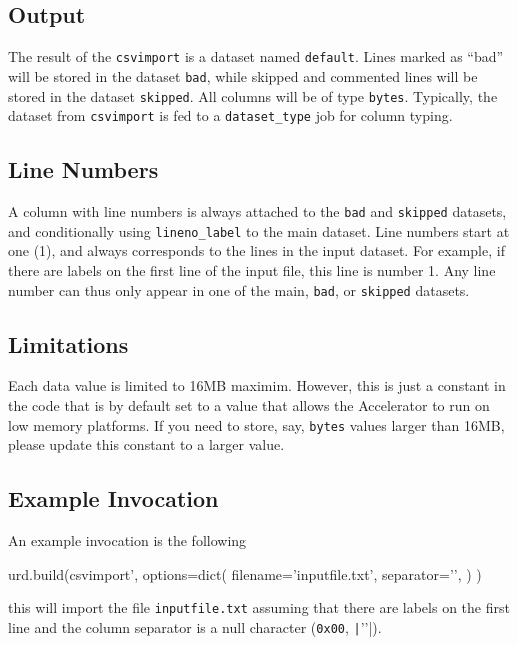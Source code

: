 \subsection{Output}
The result of the \texttt{csvimport} is a dataset named
\texttt{default}.  Lines marked as ``bad'' will be stored in the
dataset \texttt{bad}, while skipped and commented lines will be stored
in the dataset \texttt{skipped}.  All columns will be of type
\texttt{bytes}.  Typically, the dataset from
\texttt{csvimport} is fed to a \texttt{dataset\_type} job for column
typing.


\subsection{Line Numbers}
A column with line numbers is always attached to the \texttt{bad}
and \texttt{skipped} datasets, and conditionally
using \texttt{lineno\_label} to the main dataset.  Line numbers start
at one (1), and always corresponds to the lines in the input dataset.
For example, if there are labels on the first line of the input file,
this line is number 1.  Any line number can thus only appear in one of
the main, \texttt{bad}, or \texttt{skipped} datasets.



\subsection{Limitations}
Each data value is limited to 16MB maximim.  However, this is just a
constant in the code that is by default set to a value that allows the
Accelerator to run on low memory platforms.  If you need to store,
say, \texttt{bytes} values larger than 16MB, please update this
constant to a larger value.



\subsection{Example Invocation}
An example invocation is the following

\begin{python}
urd.build(csvimport',
    options=dict(
        filename='inputfile.txt',
        separator='\0',
    )
)
\end{python}
this will import the file \texttt{inputfile.txt} assuming that there
are labels on the first line and the column separator is a null
character (\texttt{0x00}, \texttt|'\0'|).


